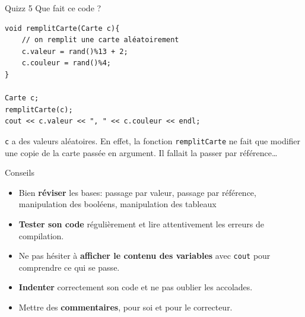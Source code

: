 \begin{frame}[fragile]{Quizz 5}
Que fait ce code ?

\begin{verbatim}
void remplitCarte(Carte c){
	// on remplit une carte aléatoirement
    c.valeur = rand()%13 + 2;
    c.couleur = rand()%4;
}

Carte c;
remplitCarte(c);
cout << c.valeur << ", " << c.couleur << endl;
\end{verbatim}

{\texttt{c} a des valeurs aléatoires. En effet, la fonction \texttt{remplitCarte} ne fait que modifier une copie de la carte passée en argument. Il fallait la passer par référence\dots}
\end{frame}


\begin{frame}{Conseils}

\begin{itemize}
	\item Bien \textbf{réviser} les bases: passage par valeur, passage par référence, manipulation des booléens, manipulation des tableaux
    \item \textbf{Tester son code} régulièrement et lire attentivement les erreurs de compilation.
    \item Ne pas hésiter à \textbf{afficher le contenu des variables} avec \texttt{cout} pour comprendre ce qui se passe.
    \item \textbf{Indenter} correctement son code et ne pas oublier les accolades.
    \item Mettre des \textbf{commentaires}, pour soi et pour le correcteur.
\end{itemize}
\end{frame}

